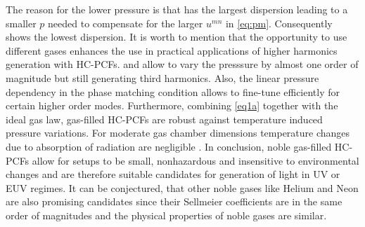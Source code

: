 \documentclass[fleqn, 10pt, twocolumn]{SelfArx}
\begin{document}
    The reason for the lower pressure is that  has the largest dispersion \cite{Borzsonyi2008} leading to a smaller $p$ needed to compensate for the larger $u^{mn}$ in \eqref{eq:pm}.
    Consequently  shows the lowest dispersion.
    It is worth to mention that the opportunity to use different gases enhances the use in practical applications of higher harmonics generation with HC-PCFs. 
     and  allow to vary the presssure by almost one order of magnitude but still generating third harmonics. Also, the linear pressure dependency in the phase matching condition
    allows to fine-tune efficiently for certain higher order modes.
    Furthermore, combining \eqref{eq1a} together with the ideal gas law, gas-filled HC-PCFs are robust against temperature induced pressure variations. For moderate gas chamber dimensions temperature changes due to absorption of radiation are negligible \cite{Serebryannikov2004}.
    In conclusion, noble gas-filled HC-PCFs allow for setups to be small, nonhazardous and insensitive to environmental changes and are therefore 
    suitable candidates for generation of light in UV or EUV regimes.
    It can be conjectured, that other noble gases like Helium and Neon are also promising candidates since their Sellmeier coefficients are in the same order of magnitudes and the physical properties of noble gases are similar. 

    \printbibliography
\end{document}
